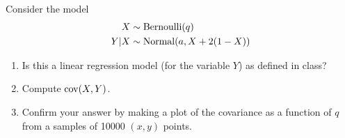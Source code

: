 \begin{exercise}
Consider the model 
\begin{align*}
X &\sim {\rm Bernoulli}(q)\\
Y|X &\sim {\rm Normal}(a,X + 2(1-X))
\end{align*}

\begin{enumerate}[label=(\alph*)]
\item Is this a linear regression model (for the variable $Y$) as defined in class? 
\item Compute ${\rm cov}(X,Y)$. 
\item Confirm your answer by making a plot of the covariance as a function of $q$ from a samples of 10000 $(x,y)$ points. 
\end{enumerate} 
\end{exercise}

